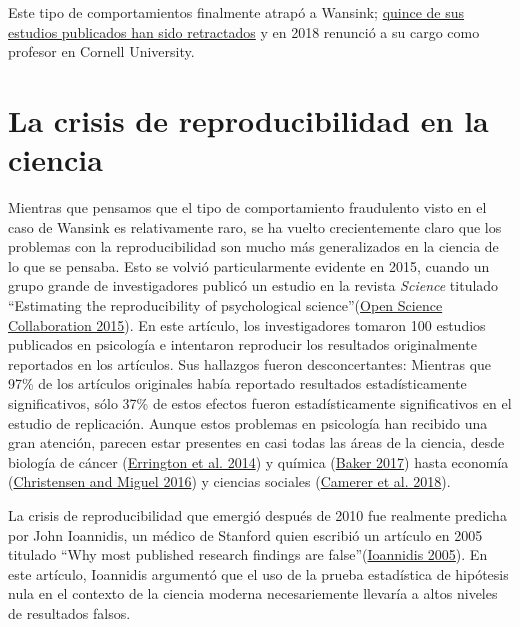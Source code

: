 \documentclass[
  12pt,
]{book}
\begin{document}
Este tipo de comportamientos finalmente atrapó a Wansink; \href{https://www.vox.com/science-and-health/2018/9/19/17879102/brian-wansink-cornell-food-brand-lab-retractions-jama}{quince de sus estudios publicados han sido retractados} y en 2018 renunció a su cargo como profesor en Cornell University.

\hypertarget{la-crisis-de-reproducibilidad-en-la-ciencia}{%
\section{La crisis de reproducibilidad en la ciencia}\label{la-crisis-de-reproducibilidad-en-la-ciencia}}

Mientras que pensamos que el tipo de comportamiento fraudulento visto en el caso de Wansink es relativamente raro, se ha vuelto crecientemente claro que los problemas con la reproducibilidad son mucho más generalizados en la ciencia de lo que se pensaba. Esto se volvió particularmente evidente en 2015, cuando un grupo grande de investigadores publicó un estudio en la revista \emph{Science} titulado ``Estimating the reproducibility of psychological science''(\protect\hyperlink{ref-open:2015}{Open Science Collaboration 2015}). En este artículo, los investigadores tomaron 100 estudios publicados en psicología e intentaron reproducir los resultados originalmente reportados en los artículos. Sus hallazgos fueron desconcertantes: Mientras que 97\% de los artículos originales había reportado resultados estadísticamente significativos, sólo 37\% de estos efectos fueron estadísticamente significativos en el estudio de replicación. Aunque estos problemas en psicología han recibido una gran atención, parecen estar presentes en casi todas las áreas de la ciencia, desde biología de cáncer (\protect\hyperlink{ref-erri:iorn:gunn:2014}{Errington et al. 2014}) y química (\protect\hyperlink{ref-bake:2017}{Baker 2017}) hasta economía (\protect\hyperlink{ref-NBERw22989}{Christensen and Miguel 2016}) y ciencias sociales (\protect\hyperlink{ref-Camerer2018EvaluatingTR}{Camerer et al. 2018}).

La crisis de reproducibilidad que emergió después de 2010 fue realmente predicha por John Ioannidis, un médico de Stanford quien escribió un artículo en 2005 titulado ``Why most published research findings are false''(\protect\hyperlink{ref-ioan:2005}{Ioannidis 2005}). En este artículo, Ioannidis argumentó que el uso de la prueba estadística de hipótesis nula en el contexto de la ciencia moderna necesariemente llevaría a altos niveles de resultados falsos.
\end{document}
